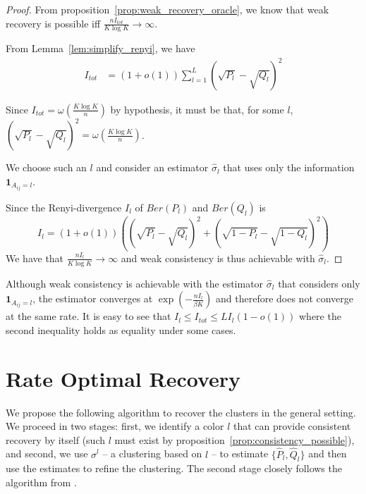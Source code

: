 \documentclass{article}
\begin{document}
\begin{proof}
From proposition~\ref{prop:weak_recovery_oracle}, we know that weak recovery is possible iff $\frac{n I_{tot}}{K \log K} \rightarrow \infty$. 

From Lemma~\ref{lem:simplify_renyi}, we have
\begin{align*}
I_{tot} &= (1+o(1))\sum_{l=1}^L (\sqrt{P_l} - \sqrt{Q_l})^2 
\end{align*}


Since $I_{tot} = \omega( \frac{K \log K}{n} )$ by hypothesis, it must be that, for some $l$, $(\sqrt{P_l} - \sqrt{Q_l})^2 = \omega( \frac{K \log K}{n} )$. 

We choose such an $l$ and consider an estimator $\hat{\sigma}_l$ that uses only the information $\mathbf{1}_{A_{ij} = l}$. 

Since the Renyi-divergence $I_l$ of $Ber(P_l)$ and $Ber(Q_l)$ is
\[
I_l = (1+o(1)) \left( (\sqrt{P_l} - \sqrt{Q_l})^2 + (\sqrt{1-P_l} - \sqrt{1-Q_l})^2 \right)
\]
We have that $\frac{ n I_l}{K \log K} \rightarrow \infty$ and weak consistency is thus achievable with $\hat{\sigma}_l$. 

\end{proof}

Although weak consistency is achievable with the estimator $\hat{\sigma}_l$ that considers only $\mathbf{1}_{A_{ij} = l}$, the estimator converges at $\exp( - \frac{n I_l}{\beta K})$ and therefore does not converge at the same rate. It is easy to see that $I_l \leq I_{tot} \leq L I_l (1 - o(1))$ where the second inequality holds as equality under some cases. 

\section{Rate Optimal Recovery}

We propose the following algorithm to recover the clusters in the general setting. We proceed in two stages: first, we identify a color $l$ that can provide consistent recovery by itself (such $l$ must exist by proposition~\ref{prop:consistency_possible}), and second, we use $\sigma^l$ -- a clustering based on $l$ -- to estimate $\{ \hat{P}_l, \hat{Q}_l \}$ and then use the estimates to refine the clustering. The second stage closely follows the algorithm from \cite{gao2015achieving}. \\
\end{document}
